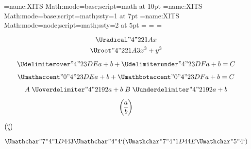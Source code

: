 

\font\4={name:XITS Math:mode=base;script=math} at 10pt
\font\5={name:XITS Math:mode=base;script=math;ssty=1} at 7pt
\font\6={name:XITS Math:mode=node;script=math;ssty=2} at 5pt
=\4 =\5 =\6

$$\Uradical "4 "221A {x}$$
$$\Uroot    "4 "221A {3}{x^3+y^3}$$

$$
  \Udelimiterover  "4 "23DE {a+b}
+ \Udelimiterunder "4 "23DF {a+b} = C
$$

$$
  \Umathaccent    "0 "4 "23DE {a+b}
+ \Umathbotaccent "0 "4 "23DF {a+b} = C
$$

$$
A \mathrel{\Uoverdelimiter  "4 "2192 {a+b}}
B \mathrel{\Uunderdelimiter "4 "2192 {a+b}}
$$

$$
{a \overwithdelims() b}
$$


\centerline{$ a \overwithdelims() b $}

$$
\Umathchar "7 "4 "1D443 \Umathchar "4 "4 `( \Umathchar "7 "4 "1D44E \Umathchar "5 "4 `)
$$

\bye

